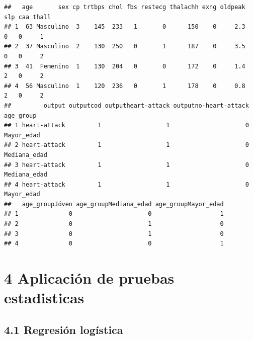 \documentclass[
]{article}
\begin{document}
\begin{verbatim}
##   age       sex cp trtbps chol fbs restecg thalachh exng oldpeak slp caa thall
## 1  63 Masculino  3    145  233   1       0      150    0     2.3   0   0     1
## 2  37 Masculino  2    130  250   0       1      187    0     3.5   0   0     2
## 3  41  Femenino  1    130  204   0       0      172    0     1.4   2   0     2
## 4  56 Masculino  1    120  236   0       1      178    0     0.8   2   0     2
##         output outputcod outputheart-attack outputno-heart-attack    age_group
## 1 heart-attack         1                  1                     0   Mayor_edad
## 2 heart-attack         1                  1                     0 Mediana_edad
## 3 heart-attack         1                  1                     0 Mediana_edad
## 4 heart-attack         1                  1                     0   Mayor_edad
##   age_groupJóven age_groupMediana_edad age_groupMayor_edad
## 1              0                     0                   1
## 2              0                     1                   0
## 3              0                     1                   0
## 4              0                     0                   1
\end{verbatim}

\hypertarget{aplicaciuxf3n-de-pruebas-estadisticas}{%
\section{4 Aplicación de pruebas
estadisticas}\label{aplicaciuxf3n-de-pruebas-estadisticas}}

\hypertarget{regresiuxf3n-loguxedstica}{%
\subsection{4.1 Regresión logística}\label{regresiuxf3n-loguxedstica}}
\end{document}
